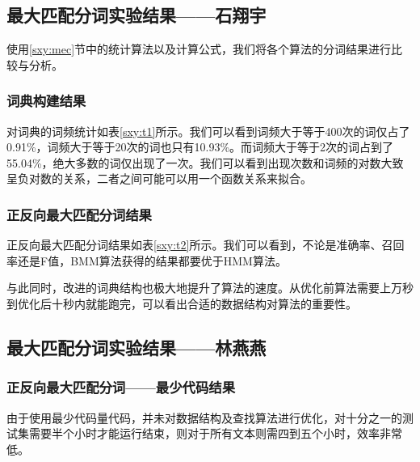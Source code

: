 \documentclass[11pt,a4paper]{article}
\begin{document}
	
	
	\subsection{最大匹配分词实验结果——石翔宇}
	使用\ref{sxy:mec}节中的统计算法以及计算公式，我们将各个算法的分词结果进行比较与分析。
	
	\subsubsection{词典构建结果}
	
	
	
	对词典的词频统计如表\ref{sxy:t1}所示。我们可以看到词频大于等于400次的词仅占了0.91\%，词频大于等于20次的词也只有10.93\%。而词频大于等于2次的词占到了55.04\%，绝大多数的词仅出现了一次。我们可以看到出现次数和词频的对数大致呈负对数的关系，二者之间可能可以用一个函数关系来拟合。
	
	\subsubsection{正反向最大匹配分词结果}
	
	
	
	正反向最大匹配分词结果如表\ref{sxy:t2}所示。我们可以看到，不论是准确率、召回率还是F值，BMM算法获得的结果都要优于HMM算法。
	
	与此同时，改进的词典结构也极大地提升了算法的速度。从优化前算法需要上万秒到优化后十秒内就能跑完，可以看出合适的数据结构对算法的重要性。
	
	\subsection{最大匹配分词实验结果——林燕燕}
	
	\subsubsection{正反向最大匹配分词——最少代码结果}
	由于使用最少代码量代码，并未对数据结构及查找算法进行优化，对十分之一的测试集需要半个小时才能运行结束，则对于所有文本则需四到五个小时，效率非常低。
	
	
\end{document}
